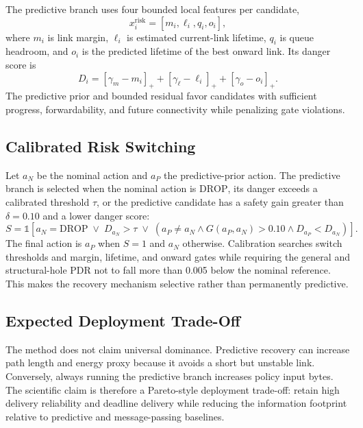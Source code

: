 \documentclass[drones,article,submit,moreauthors]{Definitions/mdpi}
\newcommand{\drop}{\mathrm{DROP}}
\begin{document}
The predictive branch uses four bounded local features per candidate,
\begin{equation}
x_i^{\mathrm{risk}}=[m_i,\ell_i,q_i,o_i],
\label{eq:risk-features}
\end{equation}
where $m_i$ is link margin, $\ell_i$ is estimated current-link lifetime, $q_i$ is queue headroom, and $o_i$ is the predicted lifetime of the best onward link. Its danger score is
\begin{equation}
D_i=[\gamma_m-m_i]_+ + [\gamma_\ell-\ell_i]_+ + [\gamma_o-o_i]_+.
\label{eq:danger}
\end{equation}
The predictive prior and bounded residual favor candidates with sufficient progress, forwardability, and future connectivity while penalizing gate violations.

\subsection{Calibrated Risk Switching}

Let $a_N$ be the nominal action and $a_P$ the predictive-prior action. The predictive branch is selected when the nominal action is $\drop$, its danger exceeds a calibrated threshold $\tau$, or the predictive candidate has a safety gain greater than $\delta=0.10$ and a lower danger score:
\begin{equation}
S=\mathbb{1}\left[a_N=\drop\;\lor\;D_{a_N}>\tau\;\lor\;\left(a_P\neq a_N\land G(a_P,a_N)>0.10\land D_{a_P}<D_{a_N}\right)\right].
\label{eq:switch}
\end{equation}
The final action is $a_P$ when $S=1$ and $a_N$ otherwise. Calibration searches switch thresholds and margin, lifetime, and onward gates while requiring the general and structural-hole PDR not to fall more than 0.005 below the nominal reference. This makes the recovery mechanism selective rather than permanently predictive.

\subsection{Expected Deployment Trade-Off}

The method does not claim universal dominance. Predictive recovery can increase path length and energy proxy because it avoids a short but unstable link. Conversely, always running the predictive branch increases policy input bytes. The scientific claim is therefore a Pareto-style deployment trade-off: retain high delivery reliability and deadline delivery while reducing the information footprint relative to predictive and message-passing baselines.
\end{document}
